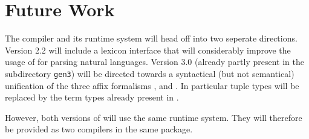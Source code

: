 \chapter {Future Work}
The \EAG compiler and its runtime system will head off into two seperate
directions. Version 2.2 will include a lexicon interface that will
considerably improve the usage of \EAG for parsing natural languages.
Version 3.0 (already partly present in the subdirectory \verb+gen3+)
will be directed towards a syntactical (but not semantical) unification
of the three affix formalisms \EAGns, \AGFL and \CDLns. In particular
tuple types will be replaced by the term types already present in \CDLns. 

However, both versions of \EAG will use the same runtime system. They
will therefore be provided as two compilers in the same package.

